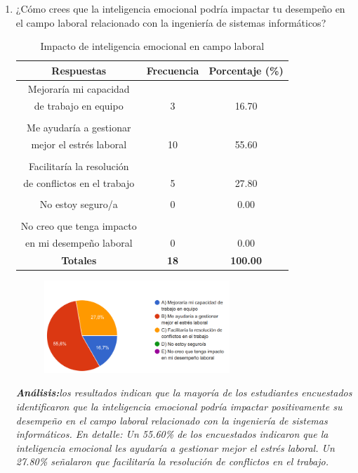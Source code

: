 \documentclass[journal]{IEEEtran}
\begin{document}
\begin{enumerate}
\item¿Cómo crees que la inteligencia emocional podría impactar tu desempeño en el campo laboral relacionado con la ingeniería de sistemas informáticos?
	\begin{table}[H]
		\renewcommand{\arraystretch}{1.3}
		\centering
		\caption{Impacto de inteligencia emocional en campo laboral}
		\begin{tabular}{c c c}
			\hline
			\textbf{Respuestas} & \textbf{Frecuencia} & \textbf{Porcentaje (\%)}\\
			\hline
			Mejoraría mi capacidad \\de trabajo en equipo & 3 & 16.70 \\
			\\Me ayudaría a gestionar \\mejor el estrés laboral & 10 & 55.60 \\
			\\Facilitaría la resolución\\ de conflictos en el trabajo & 5 & 27.80\\
			\\No estoy seguro/a & 0 & 0.00\\
			\\No creo que tenga impacto\\ en mi desempeño laboral & 0 & 0.00\\
			\hline
			\textbf{Totales} &\textbf{18}& \textbf{100.00}\\
			\hline
		\end{tabular}
	\end{table}
	\begin{figure}[h]
		\centering
		\includegraphics[width=07cm]{Pregunta 7}
	\end{figure}
	\textit{\textbf{Análisis:}los resultados indican que la mayoría de los estudiantes encuestados identificaron que la inteligencia emocional podría impactar positivamente su desempeño en el campo laboral relacionado con la ingeniería de sistemas informáticos. En detalle:
Un 55.60\% de los encuestados indicaron que la inteligencia emocional les ayudaría a gestionar mejor el estrés laboral.
Un 27.80\% señalaron que facilitaría la resolución de conflictos en el trabajo.
}
\end{enumerate}
\end{document}
